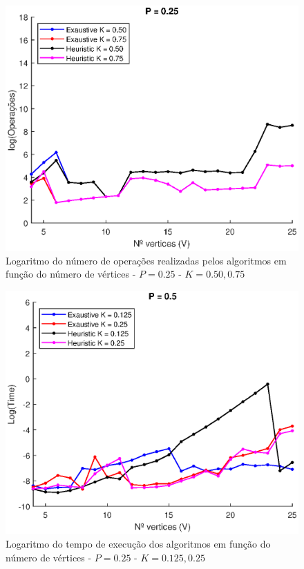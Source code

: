 \documentclass{revdetua}
\begin{document}
\begin{figure}[h!]
\centering
\includegraphics[scale = 0.5]{Figs/4_P025.eps}
\caption{Logaritmo do número de operações realizadas pelos algoritmos em função do número de vértices - $P = 0.25$ - $K = 0.50, 0.75$}
\label{4_P025}
\end{figure}


\begin{figure}[h!]
\centering
\includegraphics[scale = 0.5]{Figs/1_P050.eps}
\caption{Logaritmo do tempo de execução dos algoritmos em função do número de vértices - $P = 0.25$ - $K = 0.125, 0.25$}
\label{1_P050}
\end{figure}
\end{document}
